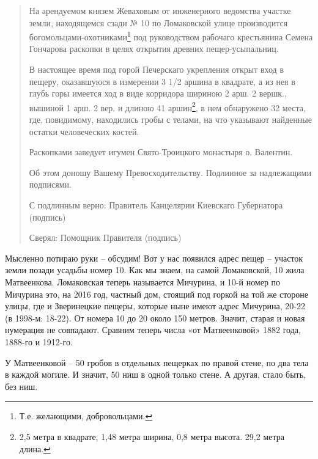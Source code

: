 \begin{quotation}
На арендуемом князем Жеваховым от инженерного ведомства участке земли, находящемся сзади № 10 по Ломаковской улице производится богомольцами-охотниками\footnote{Т.е. желающими, добровольцами.} под руководством рабочаго крестьянина Семена Гончарова раскопки в целях открытия древних пещер-усыпальниц. 


В настоящее время под горой Печерскаго укрепления открыт вход в пещеру, оказавшуюся в измерении 3 1/2 аршина в квадрате, а из нея в глубь горы имеется ход в виде корридора шириною 2 арш. 2 вершк., вышиной 1 арш. 2 вер. и длиною 41 аршин\footnote{2,5 метра в квадрате, 1,48 метра ширина, 0,8 метра высота. 29,2 метра длина.}, в нем обнаружено 32 места, где, повидимому, находились гробы с телами, на что указывают найденные остатки человеческих костей.

Раскопками заведует игумен Свято-Троицко\-го монастыря о. Валентин. 

Об этом доношу Вашему Превосходительству. Подлинное за надлежащими подписями.

С подлинным верно: Правитель Канцелярии Киевскаго Губернатора (подпись)

Сверял: Помощник Правителя (подпись)\end{quotation}

Мысленно потираю руки – обсудим! Вот у нас появился адрес пещер – участок земли позади усадьбы номер 10. Как мы знаем, на самой Ломаковской, 10 жила Матвеенкова. Ломаковская теперь называется Мичурина, и 10-й номер по Мичурина это, на 2016 год, частный дом, стоящий под горкой на той же стороне улицы, где и Зверинецкие пещеры, которые ныне имеют адрес Мичурина, 20-22 (в 1998-м: 18-22). От номера 10 до 20 около 150 метров. Значит, старая и новая нумерация не совпадают. Сравним теперь числа «от Матвеенковой» 1882 года, 1888-го и 1912-го.

У Матвеенковой – 50 гробов в отдельных пещерках по правой стене, по два тела в каждой могиле. И значит, 50 ниш в одной только стене. А другая, стало быть, без ниш.


